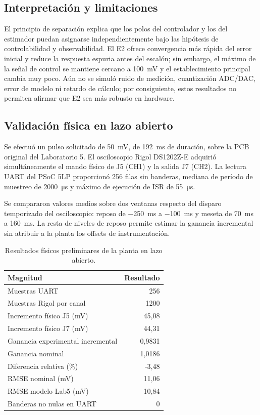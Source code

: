 \subsection{Interpretación y limitaciones}
El principio de separación explica que los polos del controlador
y los del estimador puedan asignarse independientemente bajo
las hipótesis de controlabilidad y observabilidad. El E2 ofrece
convergencia más rápida del error inicial y reduce la respuesta
espuria antes del escalón; sin embargo, el máximo de la señal de
control se mantiene cercano a \SI{100}{\milli\volt} y el
establecimiento principal cambia muy poco. Aún no se simuló
ruido de medición, cuantización ADC/DAC, error de modelo ni
retardo de cálculo; por consiguiente, estos resultados no
permiten afirmar que E2 sea más robusto en hardware.

\subsection{Validación física en lazo abierto}
Se efectuó un pulso solicitado de \SI{50}{\milli\volt}, de
\SI{192}{\milli\second} de duración, sobre la PCB original del
Laboratorio 5. El osciloscopio Rigol DS1202Z-E adquirió simultáneamente
el mando físico de J5 (CH1) y la salida J7 (CH2).
La lectura UART del PSoC 5LP proporcionó 256 filas sin banderas,
mediana de período de muestreo de \SI{2000}{\micro\second}
y máximo de ejecución de ISR de \SI{55}{\micro\second}.

Se compararon valores medios sobre dos ventanas respecto del disparo
temporizado del osciloscopio: reposo de \SI{-250}{\milli\second}
a \SI{-100}{\milli\second} y meseta de
\SI{70}{\milli\second} a \SI{160}{\milli\second}.
La resta de niveles de reposo permite estimar la ganancia incremental
sin atribuir a la planta los offsets de instrumentación.

\begin{table}[t]
\centering
\caption{Resultados físicos preliminares de la planta en lazo abierto.}
\label{tab:abierto_fisico}
\small
\begin{tabular}{@{}lr@{}}
\toprule
Magnitud & Resultado\\
\midrule
Muestras UART & 256\\
Muestras Rigol por canal & 1200\\
Incremento físico J5 (\si{\milli\volt}) & 45,08\\
Incremento físico J7 (\si{\milli\volt}) & 44,31\\
Ganancia experimental incremental & 0,9831\\
Ganancia nominal & 1,0186\\
Diferencia relativa (\%) & -3,48\\
RMSE nominal (\si{\milli\volt}) & 11,06\\
RMSE modelo Lab5 (\si{\milli\volt}) & 10,84\\
Banderas no nulas en UART & 0\\
\bottomrule
\end{tabular}
\end{table}

